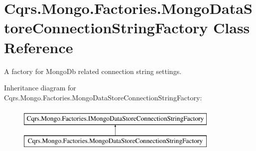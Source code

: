 \hypertarget{classCqrs_1_1Mongo_1_1Factories_1_1MongoDataStoreConnectionStringFactory}{}\section{Cqrs.\+Mongo.\+Factories.\+Mongo\+Data\+Store\+Connection\+String\+Factory Class Reference}
\label{classCqrs_1_1Mongo_1_1Factories_1_1MongoDataStoreConnectionStringFactory}


A factory for Mongo\+Db related connection string settings.  


Inheritance diagram for Cqrs.\+Mongo.\+Factories.\+Mongo\+Data\+Store\+Connection\+String\+Factory\+:\begin{figure}[H]
\begin{center}
\leavevmode
\includegraphics[height=2.000000cm]{classCqrs_1_1Mongo_1_1Factories_1_1MongoDataStoreConnectionStringFactory}
\end{center}
\end{figure}

